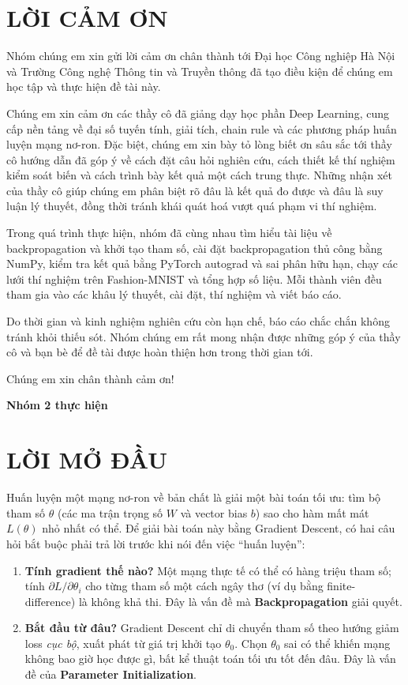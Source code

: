\documentclass[12pt,a4paper]{report}
\begin{document}

\chapter*{LỜI CẢM ƠN}
\begingroup\selectfont
{}
Nhóm chúng em xin gửi lời cảm ơn chân thành tới Đại học Công nghiệp Hà Nội và Trường Công nghệ Thông tin và Truyền thông đã tạo điều kiện để chúng em học tập và thực hiện đề tài này.

Chúng em xin cảm ơn các thầy cô đã giảng dạy học phần Deep Learning, cung cấp nền tảng về đại số tuyến tính, giải tích, chain rule và các phương pháp huấn luyện mạng nơ-ron. Đặc biệt, chúng em xin bày tỏ lòng biết ơn sâu sắc tới thầy cô hướng dẫn đã góp ý về cách đặt câu hỏi nghiên cứu, cách thiết kế thí nghiệm kiểm soát biến và cách trình bày kết quả một cách trung thực. Những nhận xét của thầy cô giúp chúng em phân biệt rõ đâu là kết quả đo được và đâu là suy luận lý thuyết, đồng thời tránh khái quát hoá vượt quá phạm vi thí nghiệm.

Trong quá trình thực hiện, nhóm đã cùng nhau tìm hiểu tài liệu về backpropagation và khởi tạo tham số, cài đặt backpropagation thủ công bằng NumPy, kiểm tra kết quả bằng PyTorch autograd và sai phân hữu hạn, chạy các lưới thí nghiệm trên Fashion-MNIST và tổng hợp số liệu. Mỗi thành viên đều tham gia vào các khâu lý thuyết, cài đặt, thí nghiệm và viết báo cáo.

Do thời gian và kinh nghiệm nghiên cứu còn hạn chế, báo cáo chắc chắn không tránh khỏi thiếu sót. Nhóm chúng em rất mong nhận được những góp ý của thầy cô và bạn bè để đề tài được hoàn thiện hơn trong thời gian tới.

Chúng em xin chân thành cảm ơn!

\hfill{\textbf{Nhóm 2 thực hiện}}
\endgroup
\clearpage
\chapter*{LỜI MỞ ĐẦU}

Huấn luyện một mạng nơ-ron về bản chất là giải một bài toán tối ưu: tìm bộ
tham số $\theta$ (các ma trận trọng số $W$ và vector bias $b$) sao cho hàm
mất mát $L(\theta)$ nhỏ nhất có thể. Để giải bài toán này bằng Gradient
Descent, có hai câu hỏi bắt buộc phải trả lời trước khi nói đến việc ``huấn
luyện'':

\begin{enumerate}
\item \textbf{Tính gradient thế nào?} Một mạng thực tế có thể có hàng triệu
  tham số; tính $\partial L/\partial\theta_i$ cho từng tham số một cách
  ngây thơ (ví dụ bằng finite-difference) là không khả thi. Đây là vấn đề
  mà \textbf{Backpropagation} giải quyết.
\item \textbf{Bắt đầu từ đâu?} Gradient Descent chỉ di chuyển tham số theo
  hướng giảm loss \emph{cục bộ}, xuất phát từ giá trị khởi tạo $\theta_0$.
  Chọn $\theta_0$ sai có thể khiến mạng không bao giờ học được gì, bất kể
  thuật toán tối ưu tốt đến đâu. Đây là vấn đề của
  \textbf{Parameter Initialization}.
\end{enumerate}
\end{document}
